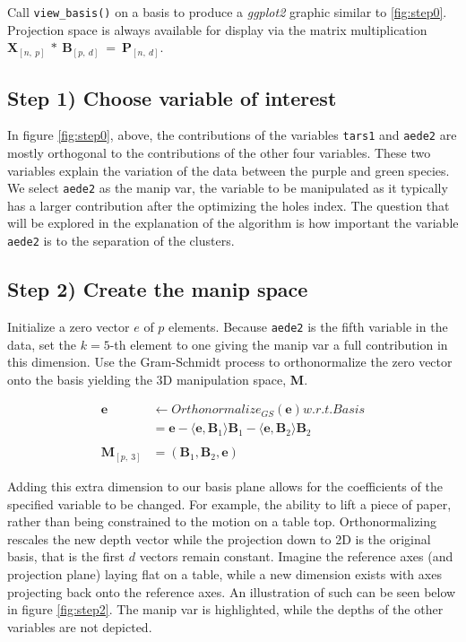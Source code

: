\documentclass{monashthesis}
\begin{document}
Call \texttt{view\_basis()} on a basis to produce a \emph{ggplot2}
graphic similar to \ref{fig:step0}. Projection space is always available
for display via the matrix multiplication
\(\textbf{X}_{[n,~p]} ~*~ \textbf{B}_{[p,~d]} ~=~ \textbf{P}_{[n,~d]}\).

\subsection{Step 1) Choose variable of
interest}\label{step-1-choose-variable-of-interest}

In figure \ref{fig:step0}, above, the contributions of the variables
\texttt{tars1} and \texttt{aede2} are mostly orthogonal to the
contributions of the other four variables. These two variables explain
the variation of the data between the purple and green species. We
select \texttt{aede2} as the manip var, the variable to be manipulated
as it typically has a larger contribution after the optimizing the holes
index. The question that will be explored in the explanation of the
algorithm is how important the variable \texttt{aede2} is to the
separation of the clusters.

\subsection{Step 2) Create the manip
space}\label{step-2-create-the-manip-space}

Initialize a zero vector \(e\) of \(p\) elements. Because \texttt{aede2}
is the fifth variable in the data, set the \(k=5\)-th element to one
giving the manip var a full contribution in this dimension. Use the
Gram-Schmidt process to orthonormalize the zero vector onto the basis
yielding the 3D manipulation space, \textbf{M}.

\begin{align*}
  \textbf{e} &\leftarrow Orthonormalize_{GS}(\textbf{e}) w.r.t. Basis \\
  &= \textbf{e} - \langle \textbf{e},\textbf{B}_1 \rangle \textbf{B}_1 - \langle \textbf{e}, \textbf{B}_2 \rangle \textbf{B}_2 \\
  \\
  \textbf{M}_{[p,~3]} &= (\textbf{B}_1,\textbf{B}_2,\textbf{e})
\end{align*}

Adding this extra dimension to our basis plane allows for the
coefficients of the specified variable to be changed. For example, the
ability to lift a piece of paper, rather than being constrained to the
motion on a table top. Orthonormalizing rescales the new depth vector
while the projection down to 2D is the original basis, that is the first
\(d\) vectors remain constant. Imagine the reference axes (and
projection plane) laying flat on a table, while a new dimension exists
with axes projecting back onto the reference axes. An illustration of
such can be seen below in figure \ref{fig:step2}. The manip var is
highlighted, while the depths of the other variables are not depicted.
\end{document}
